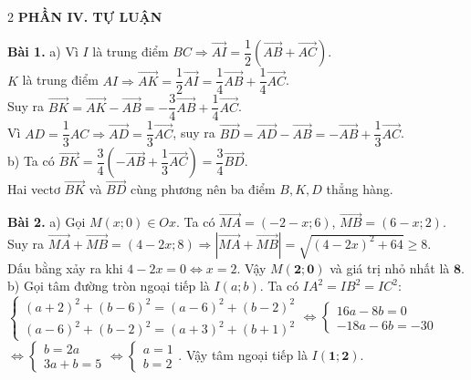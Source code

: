 \documentclass[10pt,a4paper]{article}
\begin{document}
\begin{multicols}{2}
\textbf{\color{accent}PHẦN IV. TỰ LUẬN}

\textbf{Bài 1.}
a) Vì $I$ là trung điểm $BC \Rightarrow \vec{AI} = \dfrac{1}{2}(\vec{AB} + \vec{AC})$.\\
$K$ là trung điểm $AI \Rightarrow \vec{AK} = \dfrac{1}{2}\vec{AI} = \dfrac{1}{4}\vec{AB} + \dfrac{1}{4}\vec{AC}$.\\
Suy ra $\vec{BK} = \vec{AK} - \vec{AB} = -\dfrac{3}{4}\vec{AB} + \dfrac{1}{4}\vec{AC}$.\\
Vì $AD = \dfrac{1}{3}AC \Rightarrow \vec{AD} = \dfrac{1}{3}\vec{AC}$, suy ra $\vec{BD} = \vec{AD} - \vec{AB} = -\vec{AB} + \dfrac{1}{3}\vec{AC}$.\\
b) Ta có $\vec{BK} = \dfrac{3}{4}\left(-\vec{AB} + \dfrac{1}{3}\vec{AC}\right) = \dfrac{3}{4}\vec{BD}$.\\
Hai vectơ $\vec{BK}$ và $\vec{BD}$ cùng phương nên ba điểm $B, K, D$ thẳng hàng.

\textbf{Bài 2.}
a) Gọi $M(x; 0) \in Ox$. Ta có $\vec{MA} = (-2 - x; 6)$, $\vec{MB} = (6 - x; 2)$.\\
Suy ra $\vec{MA} + \vec{MB} = (4 - 2x; 8) \Rightarrow |\vec{MA} + \vec{MB}| = \sqrt{(4 - 2x)^2 + 64} \ge 8$.\\
Dấu bằng xảy ra khi $4 - 2x = 0 \Leftrightarrow x = 2$. Vậy $M(\mathbf{2}; \mathbf{0})$ và giá trị nhỏ nhất là $\mathbf{8}$.\\
b) Gọi tâm đường tròn ngoại tiếp là $I(a; b)$. Ta có $IA^2 = IB^2 = IC^2$:\\
$\begin{cases} (a + 2)^2 + (b - 6)^2 = (a - 6)^2 + (b - 2)^2 \\ (a - 6)^2 + (b - 2)^2 = (a + 3)^2 + (b + 1)^2 \end{cases} \Leftrightarrow \begin{cases} 16a - 8b = 0 \\ -18a - 6b = -30 \end{cases}$\\
$\Leftrightarrow \begin{cases} b = 2a \\ 3a + b = 5 \end{cases} \Leftrightarrow \begin{cases} a = 1 \\ b = 2 \end{cases}$. Vậy tâm ngoại tiếp là $I(\mathbf{1}; \mathbf{2})$.


\end{multicols}
\end{document}
